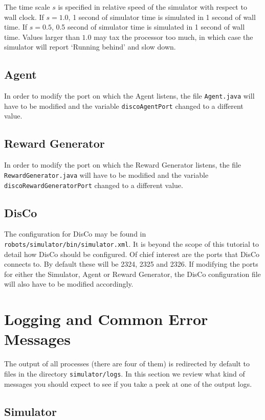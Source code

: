 \documentclass[12pt]{article}
\begin{document}
The time scale $s$ is specified in relative speed of the simulator with respect 
to wall clock. If $s=1.0$, 1 second of simulator time is simulated in 1 second
of wall time. If $s=0.5$, 0.5 second of simulator time is simulated in 1
second of wall time. Values larger than $1.0$ may tax the processor too much,
in which case the simulator will report `Running behind' and slow down.

\subsection{Agent}

In order to modify the port on which the Agent listens, the file 
\verb+Agent.java+ will have to be modified and the variable \verb+discoAgentPort+ changed to a different value.

\subsection{Reward Generator}

In order to modify the port on which the Reward Generator listens, the file 
\verb+RewardGenerator.java+ will have to be modified and the variable 
\verb+discoRewardGeneratorPort+ changed to a different value.


\subsection{DisCo}

The configuration for DisCo may be found in 
\verb+robots/simulator/bin/simulator.xml+. It is beyond the scope of this
tutorial to detail how DisCo should be configured. Of chief interest are the
ports that DisCo connects to. By default these will be 2324, 2325 and 2326.
If modifying the ports for either the Simulator, Agent or Reward Generator,
the DisCo configuration file will also have to be modified accordingly.

\section{Logging and Common Error Messages}

The output of all processes (there are four of them) is redirected by default
to files in the directory \verb+simulator/logs+. In this section we review
what kind of messages you should expect to see if you take a peek at one of
the output logs.

\subsection{Simulator}
\end{document}
